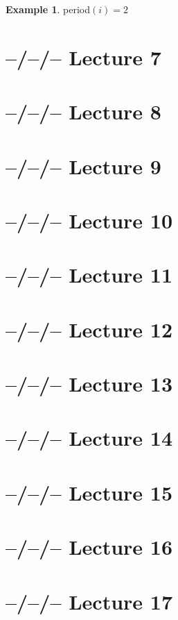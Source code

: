 \documentclass{article}
\theoremstyle{definition}
\newtheorem{ex}[thm]{Example}
\begin{document}
\begin{ex}
period$(i) = 2$
\end{ex}

\section{--/--/-- Lecture 7}

\section{--/--/-- Lecture 8}

\section{--/--/-- Lecture 9}

\section{--/--/-- Lecture 10}

\section{--/--/-- Lecture 11}

\section{--/--/-- Lecture 12}

\section{--/--/-- Lecture 13}

\section{--/--/-- Lecture 14}

\section{--/--/-- Lecture 15}

\section{--/--/-- Lecture 16}

\section{--/--/-- Lecture 17}
\end{document}
